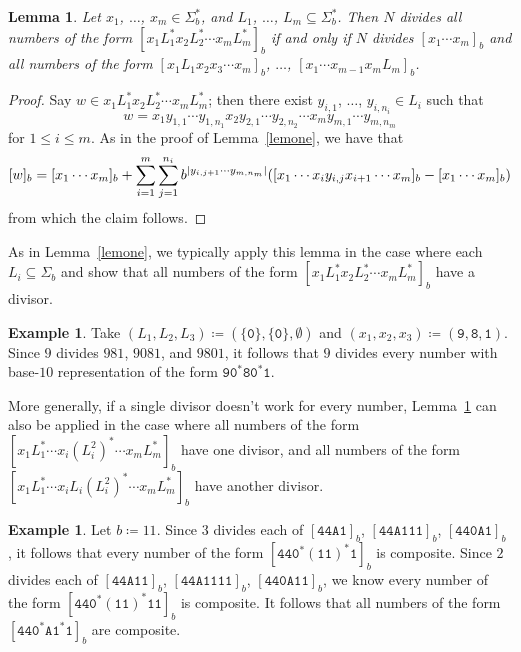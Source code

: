 \documentclass[12pt]{article}
\DeclarePairedDelimiter\abs{\lvert}{\rvert}
\theoremstyle{plain}
\newtheorem{lemma}[theorem]{Lemma}
\theoremstyle{definition}
\newtheorem{example}[theorem]{Example}
\newcommand{\0}{\mathtt{0}}
\newcommand{\1}{\mathtt{1}}
\newcommand{\2}{\mathtt{2}}
\newcommand{\3}{\mathtt{3}}
\newcommand{\4}{\mathtt{4}}
\newcommand{\5}{\mathtt{5}}
\newcommand{\6}{\mathtt{6}}
\newcommand{\7}{\mathtt{7}}
\newcommand{\8}{\mathtt{8}}
\newcommand{\9}{\mathtt{9}}
\newcommand{\A}{\mathtt{A}}
\begin{document}
\begin{lemma}\label{lemtwo}
Let $x_1$, $\dotsc$, $x_m\in \Sigma^*_b$, and $L_1$, $\dotsc$, 
$L_m\subseteq\Sigma^*_b$.  Then
$N$ divides all numbers of the form $[x_1L_1^*x_2L_2^*\dotsm x_mL_m^*]_b$
if and only if
$N$ divides $[x_1\dotsm x_m]_b$ and all numbers of the form 
$[x_1L_1x_2x_3\dotsm x_m]_b$, $\dotsc$, $[x_1\dotsm x_{m-1}x_mL_m]_b$.
\end{lemma}
\begin{proof}
Say $w\in x_1L_1^*x_2L_2^*\dotsm x_mL_m^*$; then there exist
$y_{i,1}$, $\dotsc$, $y_{i,n_i}\in L_i$ such that
\[ w = x_1y_{1,1}\dotsm y_{1,n_1}x_2y_{2,1}\dotsm y_{2,n_2}\dotsm x_m y_{m,1}\dotsm y_{m,n_m} \]
for $1\leq i\leq m$.
As in the proof of Lemma~\ref{lemone}, we have that
\[ [w]_b = [x_1\dotsm x_m]_b + \sum_{i=1}^m\sum_{j=1}^{n_i} b^{\abs{y_{i,j+1}\dotsm y_{m,n_m}}}([x_1\dotsm x_i y_{i,j} x_{i+1}\dotsm x_m]_b-[x_1\dotsm x_m]_b) \]
from which the claim follows.
\end{proof}
As in Lemma~\ref{lemone}, we typically apply this lemma in the case 
where each $L_i\subseteq\Sigma_b$ and show that all numbers of the 
form $[x_1L_1^*x_2L_2^*\dotsm x_mL_m^*]_b$ have a divisor.
\begin{example}
Take $(L_1, L_2, L_3) \coloneqq (\{ \0 \},\{\0\},\emptyset)$ and $(x_1,x_2, x_3) \coloneqq (\9, \8, \1)$.
Since $9$ divides $981$, $9081$, and $9801$, it follows that $9$ 
divides every number with base-$10$ representation
of the form $\9\0^*\8\0^*\1$.
\end{example}

More generally, if a single divisor doesn't work for every number, 
Lemma~\ref{lemtwo} can also be applied in the case where all numbers 
of the form $[x_1L_1^*\dotsm x_i(L_i^2)^*\dotsm x_mL_m^*]_b$ have one
divisor, and all numbers of the form 
$[x_1L_1^*\dotsm x_iL_i(L_i^2)^*\dotsm x_mL_m^*]_b$ have another divisor.
\begin{example}
Let $b \coloneqq 11$.
Since $3$ divides each of $[\4\4\A\1]_b$,
$[\4\4\A\1\1\1]_b$,
$[\4\4\0\A\1]_b$ ,
it follows that
every number of the form $[\4\4\0^*(\1\1)^*\1]_b$ is composite.
Since $2$ divides each of $[\4\4\A\1\1]_b$,
$[\4\4\A\1\1\1\1]_b$, $[\4\4\0\A\1\1]_b$, we know
every number of the form $[\4\4\0^*(\1\1)^*\1\1]_b$ is composite.
It follows that all numbers of the form $[\4\4\0^*\A\1^*\1]_b$ are composite.
\end{example}
\end{document}
